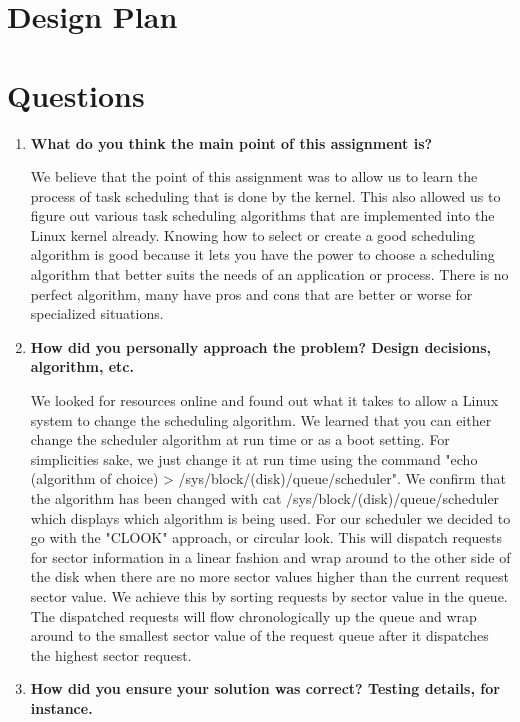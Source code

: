 \documentclass[onecolumn, draftclsnofoot,10pt, compsoc]{IEEEtran}
\begin{document}


\section{Design Plan}
\section{Questions}
	\begin{enumerate}
		\item \textbf{What do you think the main point of this assignment is?}
	
		We believe that the point of this assignment was to allow us to learn the process of 
		task scheduling that is done by the kernel. This also allowed us to figure out various
		task scheduling algorithms that are implemented into the Linux kernel already. Knowing 
		how to select or create a good scheduling algorithm is good because it lets you have the 
		power to choose a scheduling algorithm that better suits the needs of an application or
		process. There is no perfect algorithm, many have pros and cons that are better or worse
		for specialized situations.
		
		\item \textbf{How did you personally approach the problem? Design decisions, algorithm, etc.}
	
		We looked for resources online and found out what it takes to allow a Linux system 
		to change the scheduling algorithm. We learned that you can either change the scheduler
		algorithm at run time or as a boot setting. For simplicities sake, we just change it
		at run time using the command "echo (algorithm of choice) > /sys/block/(disk)/queue/scheduler". We
		confirm that the algorithm has been changed with cat /sys/block/(disk)/queue/scheduler which displays 
		which algorithm is being used. For our scheduler we decided to go with the "CLOOK" approach, or circular look.
		This will dispatch requests for sector information in a linear fashion and wrap around to the other
		side of the disk when there are no more sector values higher than the current request sector value.
		We achieve this by sorting requests by sector value in the queue. The dispatched requests will flow
		chronologically up the queue and wrap around to the smallest sector value of the request queue after it dispatches the highest sector request. 
		
		\item \textbf{How did you ensure your solution was correct? Testing details, for instance.}
		

\end{enumerate}
\end{document}
